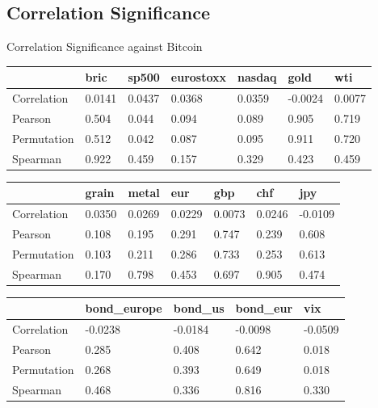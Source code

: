 \documentclass{beamer}
\newcommand\SmallerFont{\fontsize{8}{10}\selectfont}
\begin{document}
\subsection{Correlation Significance}

%

\begin{frame}{Correlation Significance against Bitcoin}
\SmallerFont
\begin{table}[]
\begin{tabular}{lllllll}
\toprule
 & bric & sp500 & eurostoxx & nasdaq & gold & wti \\
\midrule
Correlation & 0.0141 & 0.0437 & 0.0368 & 0.0359 & -0.0024 & 0.0077 \\
Pearson & 0.504 & 0.044 & 0.094 & 0.089 & 0.905 & 0.719 \\
Permutation & 0.512 & 0.042 & 0.087 & 0.095 & 0.911 & 0.720 \\
Spearman & 0.922 & 0.459 & 0.157 & 0.329 & 0.423 & 0.459 \\
\bottomrule
\end{tabular}

\end{table}

\begin{table}[]
\begin{tabular}{lllllll}
\toprule
 & grain & metal & eur & gbp & chf & jpy \\
\midrule
Correlation & 0.0350 & 0.0269 & 0.0229 & 0.0073 & 0.0246 & -0.0109 \\
Pearson & 0.108 & 0.195 & 0.291 & 0.747 & 0.239 & 0.608 \\
Permutation & 0.103 & 0.211 & 0.286 & 0.733 & 0.253 & 0.613 \\
Spearman & 0.170 & 0.798 & 0.453 & 0.697 & 0.905 & 0.474 \\
\bottomrule
\end{tabular}

\end{table}

\begin{table}[]
\begin{tabular}{lllll}

\toprule
 & bond\_europe & bond\_us & bond\_eur & vix \\
\midrule
Correlation & -0.0238 & -0.0184 & -0.0098 & -0.0509 \\
Pearson & 0.285 & 0.408 & 0.642 & 0.018 \\
Permutation & 0.268 & 0.393 & 0.649 & 0.018 \\
Spearman & 0.468 & 0.336 & 0.816 & 0.330 \\
\bottomrule
\end{tabular}
\end{table}

\end{frame}
\end{document}
